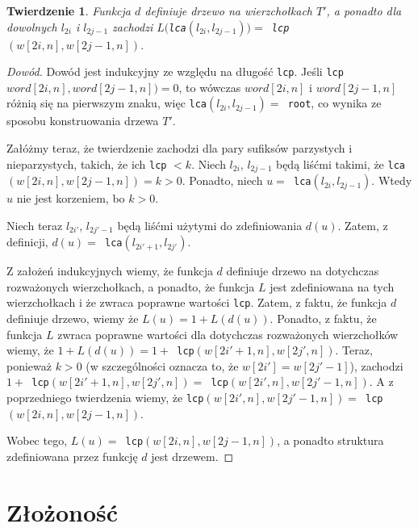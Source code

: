 \documentclass[a4paper,oneside,10pt]{book}
\newtheorem*{theorem}{Twierdzenie}
\begin{document}
\begin{theorem}
Funkcja $d$ definiuje drzewo na wierzchołkach $T'$, a ponadto dla dowolnych $l_{2i}$ i $l_{2j-1}$ zachodzi $L($\verb|lca|$(l_{2i}, l_{2j-1})) = $\verb| lcp|$(w[2i,n], w[2j-1,n])$.
\end{theorem}
\begin{proof}[Dowód]
Dowód jest indukcyjny ze względu na długość \verb|lcp|. Jeśli \verb|lcp|$word[2i, n], word[2j-1,n]) = 0$, to wówczas $word[2i, n]$ i $word[2j-1,n]$ różnią się na pierwszym znaku, więc \verb|lca|$(l_{2i}, l_{2j-1}) = $\verb| root|, co wynika ze sposobu konstruowania drzewa $T'$.

Załóżmy teraz, że twierdzenie zachodzi dla pary sufiksów parzystych i nieparzystych, takich, że ich \verb|lcp| $< k$. Niech $l_{2i},\,l_{2j-1}$ będą liśćmi takimi, że \verb|lca|$(w[2i,n], w[2j-1,n]) = k > 0$. Ponadto, niech $u = $\verb| lca|$(l_{2i}, l_{2j-1})$. Wtedy $u$ nie jest korzeniem, bo $k > 0$.

Niech teraz $l_{2i'}$, $l_{2j'-1}$ będą liśćmi użytymi do zdefiniowania $d(u)$. Zatem, z definicji, $d(u) = $\verb| lca|$(l_{2i'+1},l_{2j'})$.

Z założeń indukcyjnych wiemy, że funkcja $d$ definiuje drzewo na dotychczas rozważonych wierzchołkach, a ponadto, że funkcja $L$ jest zdefiniowana na tych wierzchołkach i że zwraca poprawne wartości \verb|lcp|. Zatem, z faktu, że funkcja $d$ definiuje drzewo, wiemy że $L(u) = 1 + L(d(u))$. Ponadto, z faktu, że funkcja $L$ zwraca poprawne wartości dla dotychczas rozważonych wierzchołków wiemy, że $1 + L(d(u)) = 1 + $\verb| lcp|$(w[2i'+1,n],w[2j',n])$. Teraz, ponieważ $k > 0$ (w szczególności oznacza to, że $w[2i'] = w[2j'-1]$), zachodzi $1 + $\verb| lcp|$(w[2i'+1,n],w[2j',n]) = $\verb| lcp|$(w[2i',n],w[2j'-1,n])$. A z poprzedniego twierdzenia wiemy, że \verb|lcp|$(w[2i',n],w[2j'-1,n]) = $\verb| lcp|$(w[2i,n],w[2j-1,n])$.

Wobec tego, $L(u) = $\verb| lcp|$(w[2i,n],w[2j-1,n])$, a ponadto struktura zdefiniowana przez funkcję $d$ jest drzewem.
\end{proof}

\section*{Złożoność}
\end{document}
